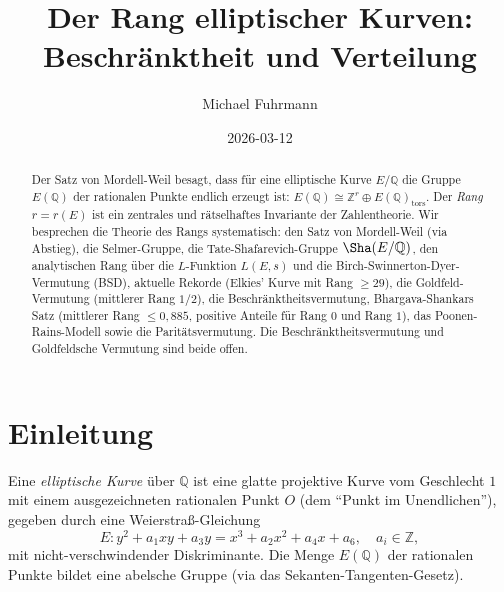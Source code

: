 \documentclass[12pt,a4paper]{amsart}
\theoremstyle{definition}
\theoremstyle{remark}
\newcommand{\Z}{\mathbb{Z}}
\newcommand{\Q}{\mathbb{Q}}
\begin{document}

\title{Der Rang elliptischer Kurven:\\
  Beschränktheit und Verteilung}

\author{Michael Fuhrmann}
\address{Specialist Mathematics Project, Build 167}
\date{2026-03-12}

\begin{abstract}
Der Satz von Mordell-Weil besagt, dass für eine elliptische Kurve $E/\Q$ die Gruppe
$E(\Q)$ der rationalen Punkte endlich erzeugt ist:
$E(\Q) \cong \Z^r \oplus E(\Q)_{\mathrm{tors}}$.
Der \emph{Rang} $r = r(E)$ ist ein zentrales und rätselhaftes Invariante der
Zahlentheorie.
Wir besprechen die Theorie des Rangs systematisch: den Satz von Mordell-Weil (via
Abstieg), die Selmer-Gruppe, die Tate-Shafarevich-Gruppe $\Sha(E/\Q)$, den analytischen
Rang über die $L$-Funktion $L(E,s)$ und die Birch-Swinnerton-Dyer-Vermutung (BSD),
aktuelle Rekorde (Elkies' Kurve mit Rang $\geq 29$), die Goldfeld-Vermutung
(mittlerer Rang $1/2$), die Beschränktheitsver\-mutung, Bhargava-Shankars Satz
(mittlerer Rang $\leq 0{,}885$, positive Anteile für Rang $0$ und Rang $1$),
das Poonen-Rains-Modell sowie die Paritätsvermutung.
Die Beschränktheitsvermutung und Goldfeldsche Vermutung sind beide offen.
\end{abstract}

\maketitle

\tableofcontents

\section{Einleitung}

Eine \emph{elliptische Kurve} über $\Q$ ist eine glatte projektive Kurve vom Geschlecht
$1$ mit einem ausgezeichneten rationalen Punkt $O$ (dem ``Punkt im Unendlichen''),
gegeben durch eine Weierstraß-Gleichung
\[
  E\colon y^2 + a_1 xy + a_3 y = x^3 + a_2 x^2 + a_4 x + a_6, \quad a_i \in \Z,
\]
mit nicht-verschwindender Diskriminante.
Die Menge $E(\Q)$ der rationalen Punkte bildet eine abelsche Gruppe
(via das Sekanten-Tangenten-Gesetz).
\end{document}
